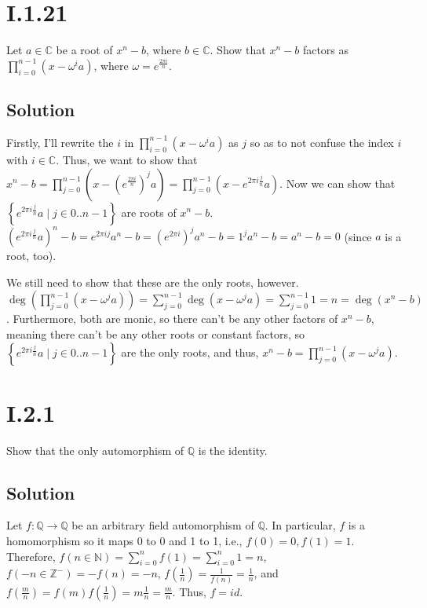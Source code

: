 \documentclass[fleqn]{article}
\begin{document}
    \pagebreak
    
    \section{I.1.21}
    Let $a \in \mathbb{C}$ be a root of $x^n - b$, where $b \in \mathbb{C}$.  Show that $x^n - b$ factors as $\prod\limits_{i = 0}^{n - 1} (x - \omega^i a)$, where $\omega = e^{\frac{2 \pi i}{n}}$.
        
        \subsection{Solution}
        Firstly, I'll rewrite the $i$ in $\prod\limits_{i = 0}^{n - 1} (x - \omega^i a)$ as $j$ so as to not confuse the index $i$ with $i \in \mathbb{C}$.  Thus, we want to show that $x^n - b = \prod\limits_{j = 0}^{n - 1}\left(x - \left(e^{\frac{2 \pi i}{n}}\right)^j a\right) = \prod\limits_{j = 0}^{n - 1}\left(x - e^{2 \pi i \frac{j}{n}} a\right)$.  Now we can show that $\left\{e^{2 \pi i \frac{j}{n}} a \mid j \in 0..n - 1\right\}$ are roots of $x^n - b$.  $\left(e^{2 \pi i \frac{j}{n}} a\right)^n - b = e^{2 \pi i j} a^n - b = \left(e^{2 \pi i}\right)^j a^n - b = 1^j a^n - b = a^n - b = 0$ (since $a$ is a root, too).  
        
        We still need to show that these are the only roots, however.  $\deg\left(\prod\limits_{j = 0}^{n - 1}\left(x - \omega^j a\right)\right) = \sum\limits_{j = 0}^{n - 1} \deg\left(x - \omega^j a\right) = \sum\limits_{j = 0}^{n - 1} 1 = n = \deg(x^n - b)$.  Furthermore, both are monic, so there can't be any other factors of $x^n - b$, meaning there can't be any other roots or constant factors, so $\left\{e^{2 \pi i \frac{j}{n}} a \mid j \in 0..n - 1\right\}$ are the only roots, and thus, $x^n - b = \prod\limits_{j = 0}^{n - 1}\left(x - \omega^j a\right)$.
    
    \section{I.2.1}
    Show that the only automorphism of $\mathbb{Q}$ is the identity.
        
        \subsection{Solution}
        Let $f: \mathbb{Q} \to \mathbb{Q}$ be an arbitrary field automorphism of $\mathbb{Q}$.  In particular, $f$ is a homomorphism so it maps 0 to 0 and 1 to 1, i.e., $f(0) = 0, f(1) = 1$.  Therefore, $f(n \in \mathbb{N}) = \sum\limits_{i = 0}^n f(1) = \sum\limits_{i = 0}^n 1 = n$, $f(-n \in \mathbb{Z}^-) = -f(n) = -n$, $f\left(\frac{1}{n}\right) = \frac{1}{f(n)} = \frac{1}{n}$, and $f\left(\frac{m}{n}\right) = f(m)f\left(\frac{1}{n}\right) = m \frac{1}{n} = \frac{m}{n}$.  Thus, $f = id$.
    
\end{document}
